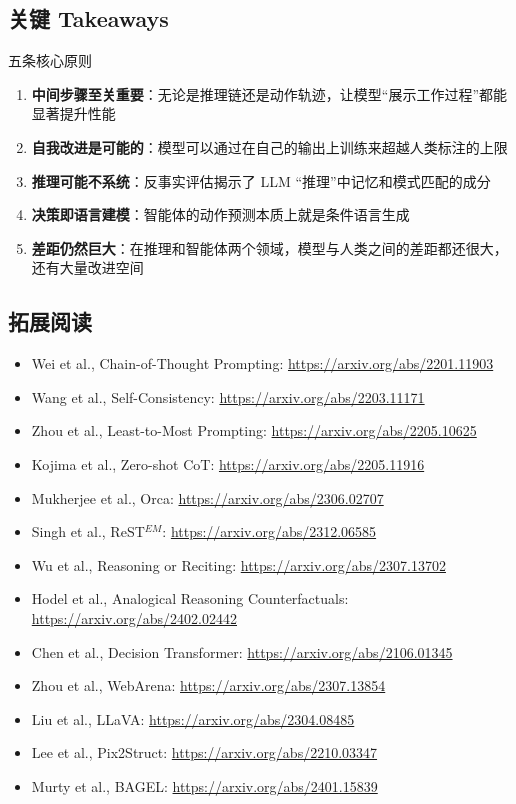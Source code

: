 \documentclass[a4paper]{article}
\begin{document}
\subsection{关键 Takeaways}

\begin{importantbox}{五条核心原则}
\begin{enumerate}
    \item \textbf{中间步骤至关重要}：无论是推理链还是动作轨迹，让模型``展示工作过程''都能显著提升性能
    \item \textbf{自我改进是可能的}：模型可以通过在自己的输出上训练来超越人类标注的上限
    \item \textbf{推理可能不系统}：反事实评估揭示了 LLM ``推理''中记忆和模式匹配的成分
    \item \textbf{决策即语言建模}：智能体的动作预测本质上就是条件语言生成
    \item \textbf{差距仍然巨大}：在推理和智能体两个领域，模型与人类之间的差距都还很大，还有大量改进空间
\end{enumerate}
\end{importantbox}

\subsection{拓展阅读}

\begin{itemize}
    \item Wei et al., Chain-of-Thought Prompting: \url{https://arxiv.org/abs/2201.11903}
    \item Wang et al., Self-Consistency: \url{https://arxiv.org/abs/2203.11171}
    \item Zhou et al., Least-to-Most Prompting: \url{https://arxiv.org/abs/2205.10625}
    \item Kojima et al., Zero-shot CoT: \url{https://arxiv.org/abs/2205.11916}
    \item Mukherjee et al., Orca: \url{https://arxiv.org/abs/2306.02707}
    \item Singh et al., ReST$^{EM}$: \url{https://arxiv.org/abs/2312.06585}
    \item Wu et al., Reasoning or Reciting: \url{https://arxiv.org/abs/2307.13702}
    \item Hodel et al., Analogical Reasoning Counterfactuals: \url{https://arxiv.org/abs/2402.02442}
    \item Chen et al., Decision Transformer: \url{https://arxiv.org/abs/2106.01345}
    \item Zhou et al., WebArena: \url{https://arxiv.org/abs/2307.13854}
    \item Liu et al., LLaVA: \url{https://arxiv.org/abs/2304.08485}
    \item Lee et al., Pix2Struct: \url{https://arxiv.org/abs/2210.03347}
    \item Murty et al., BAGEL: \url{https://arxiv.org/abs/2401.15839}
\end{itemize}
\end{document}
